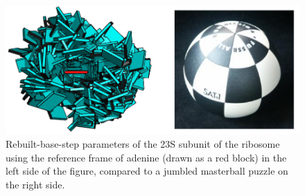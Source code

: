 \begin{figure}
\centering
\includegraphics[angle=0, scale=0.4]{Chapter2/masterball2.png}
\caption{Rebuilt-base-step  parameters  of  the  23S  subunit  of  the
  ribosome using the reference frame of adenine (drawn as a red block)
  in the  left side  of the figure,  compared to a  jumbled masterball
  puzzle on the right side.}
\label{fig:masterball}
\end{figure}




